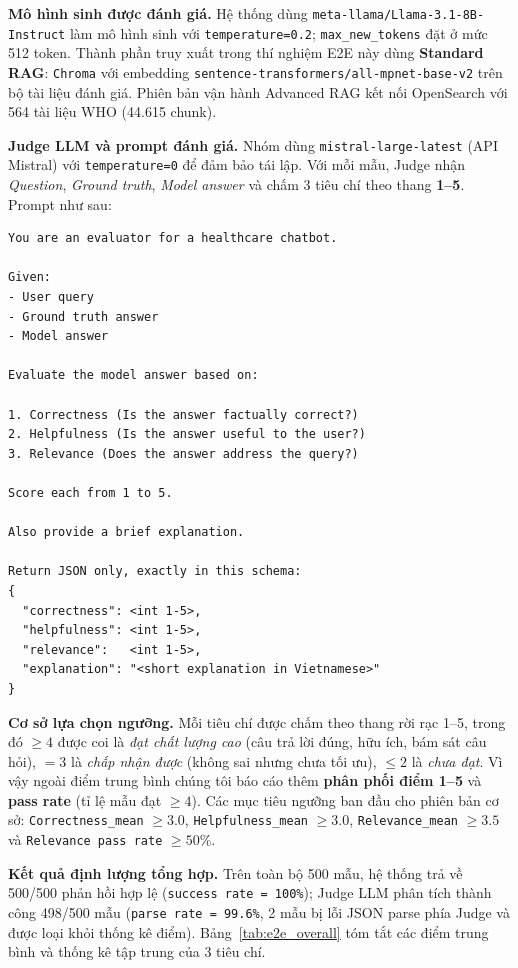 \textbf{Mô hình sinh được đánh giá.}
Hệ thống dùng \texttt{meta-llama/Llama-3.1-8B-Instruct} làm mô hình sinh với \texttt{temperature=0.2}; \texttt{max\_new\_tokens} đặt ở mức 512 token. Thành phần truy xuất trong thí nghiệm E2E này dùng \textbf{Standard RAG}: \texttt{Chroma} với embedding \texttt{sentence-transformers/all-mpnet-base-v2} trên bộ tài liệu đánh giá. Phiên bản vận hành Advanced RAG kết nối OpenSearch với 564 tài liệu WHO (44.615 chunk).

\textbf{Judge LLM và prompt đánh giá.}
Nhóm dùng \texttt{mistral-large-latest} (API Mistral) với \texttt{temperature=0} để đảm bảo tái lập. Với mỗi mẫu, Judge nhận \textit{Question}, \textit{Ground truth}, \textit{Model answer} và chấm 3 tiêu chí theo thang \textbf{1--5}. Prompt như sau:

\begin{verbatim}
You are an evaluator for a healthcare chatbot.

Given:
- User query
- Ground truth answer
- Model answer

Evaluate the model answer based on:

1. Correctness (Is the answer factually correct?)
2. Helpfulness (Is the answer useful to the user?)
3. Relevance (Does the answer address the query?)

Score each from 1 to 5.

Also provide a brief explanation.

Return JSON only, exactly in this schema:
{
  "correctness": <int 1-5>,
  "helpfulness": <int 1-5>,
  "relevance":   <int 1-5>,
  "explanation": "<short explanation in Vietnamese>"
}
\end{verbatim}

\textbf{Cơ sở lựa chọn ngưỡng.}
Mỗi tiêu chí được chấm theo thang rời rạc 1--5, trong đó $\ge 4$ được coi là \textit{đạt chất lượng cao} (câu trả lời đúng, hữu ích, bám sát câu hỏi), $=3$ là \textit{chấp nhận được} (không sai nhưng chưa tối ưu), $\le 2$ là \textit{chưa đạt}. Vì vậy ngoài điểm trung bình chúng tôi báo cáo thêm \textbf{phân phối điểm 1--5} và \textbf{pass rate} (tỉ lệ mẫu đạt $\ge 4$). Các mục tiêu ngưỡng ban đầu cho phiên bản cơ sở: \texttt{Correctness\_mean} $\ge 3.0$, \texttt{Helpfulness\_mean} $\ge 3.0$, \texttt{Relevance\_mean} $\ge 3.5$ và \texttt{Relevance pass rate} $\ge 50\%$.

\textbf{Kết quả định lượng tổng hợp.}
Trên toàn bộ 500 mẫu, hệ thống trả về 500/500 phản hồi hợp lệ (\texttt{success rate = 100\%}); Judge LLM phân tích thành công 498/500 mẫu (\texttt{parse rate = 99.6\%}, 2 mẫu bị lỗi JSON parse phía Judge và được loại khỏi thống kê điểm). Bảng~\ref{tab:e2e_overall} tóm tắt các điểm trung bình và thống kê tập trung của 3 tiêu chí.

